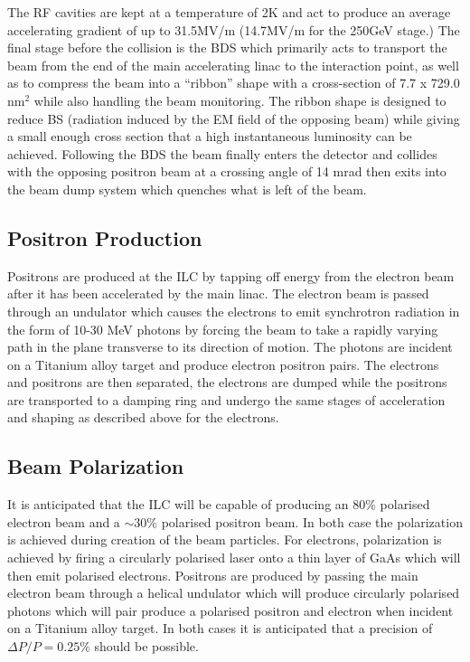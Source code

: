The \ac{RF} cavities are kept at a temperature of 2K and act to produce an average accelerating gradient of up to 31.5MV/m (14.7MV/m for the 250GeV stage.)  The final stage before the collision is the \ac{BDS} which primarily acts to transport the beam from the end of the main accelerating linac to the interaction point, as well as to compress the beam into a ``ribbon'' shape with a cross-section of 7.7 x 729.0 nm$^2$ while also handling the beam monitoring. The ribbon shape is designed to reduce \ac{BS} (radiation induced by the \ac{EM} field of the opposing beam) while giving a small enough cross section that a high instantaneous luminosity can be achieved. Following the \ac{BDS} the beam finally enters the detector and collides with the opposing positron beam at a crossing angle of 14 mrad then exits into the beam dump system which quenches what is left of the beam.

\subsection{Positron Production}
Positrons are produced at the \ac{ILC} by tapping off energy from the electron beam after it has been accelerated by the main linac. The electron beam is passed through an undulator which causes the electrons to emit synchrotron radiation in the form of 10-30 MeV photons by forcing the beam to take a rapidly varying path in the plane transverse to its direction of motion. The photons are incident on a Titanium alloy target and produce electron positron pairs. The electrons and positrons are then separated, the electrons are dumped while the positrons are transported to a damping ring and undergo the same stages of acceleration and shaping as described above for the electrons.

\subsection{Beam Polarization}
It is anticipated that the \ac{ILC} will be capable of producing an 80\% polarised electron beam and a $\sim$30\% polarised positron beam\cite{MoortgatPick:2005cw}. In both case the polarization is achieved during creation of the beam particles. For electrons, polarization is achieved by firing a circularly polarised laser onto a thin layer of GaAs which will then emit polarised electrons. Positrons are produced by passing the main electron beam through a helical undulator which will produce circularly polarised photons which will pair produce a polarised positron and electron when incident on a Titanium alloy target. In both cases it is anticipated that a precision of $\Delta P/P=0.25\%$ should be possible\cite{Aurand:2009kp}.

